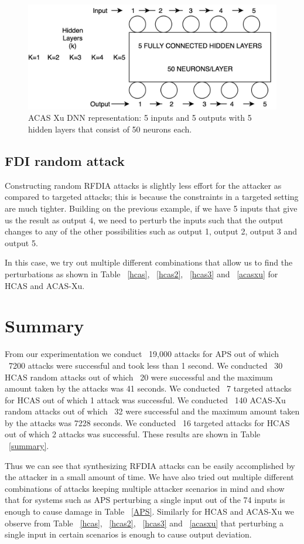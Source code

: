 \begin{figure}
	\centering
	\includegraphics[width=0.7\linewidth]{Images/ACASXuDNN}
	\caption[ACAS Xu DNN]{ACAS Xu DNN representation: 5 inputs and 5 outputs with 5 hidden layers that consist of 50 neurons each.}
	\label{fig:acasxudnn}
\end{figure}

\subsection{FDI random attack} 
Constructing random \ac{RFDIA} attacks is slightly less effort for the attacker as compared to targeted attacks; this is because the constraints in a targeted setting are much tighter. 
Building on the previous example, if we have 5 inputs that give us the result as output 4, we need to perturb the inputs such that the output changes to any of the other possibilities such as output 1, output 2, output 3 and output 5.

In this case, we try out multiple different combinations that allow us to find the perturbations as shown in Table ~\ref{hcas}, ~\ref{hcas2}, ~\ref{hcas3} and ~\ref{acasxu} for \ac{HCAS} and \ac{ACAS-Xu}.



\section{Summary}
From our experimentation we conduct ~19,000 attacks for \ac{APS} out of which ~7200 attacks were successful and took less than 1 second. 
We conducted ~30 \ac{HCAS} random attacks out of which ~20 were successful and the maximum amount taken by the attacks was 41 seconds. 
We conducted ~7 targeted attacks for \ac{HCAS} out of which 1 attack was successful.
We conducted ~140 \ac{ACAS-Xu} random attacks out of which ~32 were successful and the maximum amount taken by the attacks was 7228 seconds. 
We conducted ~16 targeted attacks for \ac{HCAS} out of which 2 attacks was successful.
These results are shown in Table ~\ref{summary}.

Thus we can see that synthesizing \ac{RFDIA} attacks can be easily accomplished by the attacker in a small amount of time. 
We have also tried out multiple different combinations of attacks keeping multiple attacker scenarios in mind and show that for systems such as \ac{APS} perturbing a single input out of the 74 inputs is enough to cause damage in Table ~\ref{APS}.
Similarly for \ac{HCAS} and \ac{ACAS-Xu} we observe  from Table ~\ref{hcas}, ~\ref{hcas2}, ~\ref{hcas3} and ~\ref{acasxu} that perturbing a single input in certain scenarios is enough to cause output deviation. 

